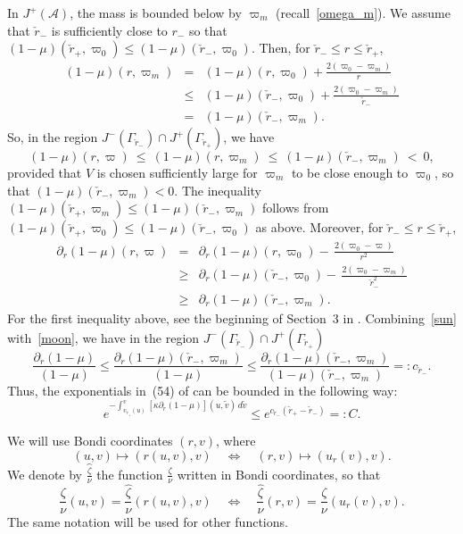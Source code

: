 \documentclass[a4paper,11pt,oneside,reqno]{amsart}
\newcommand{\cal}{\mathcal}
\newcommand{\ckrm}{\check r_-}
\newcommand{\ckrp}{\check r_+}
\newcommand{\hatz}{\widehat{\frac{\zeta}{\nu}}}
\newcommand{\vgrp}{v_{\ckrp}}
\newcommand{\ug}{u_r}
\begin{document}
In $J^+({\cal A})$, the mass is bounded below by $\varpi_m$ (recall~\eqref{omega_m}). We assume that
$\ckrm$ is sufficiently close to $r_-$ so that
$(1-\mu)(\ckrp,\varpi_0)\leq(1-\mu)(\ckrm,\varpi_0)$. Then,
for $\ckrm\leq r\leq\ckrp$,
\begin{eqnarray*}
(1-\mu)(r,\varpi_m)&=&(1-\mu)(r,\varpi_0)+\frac{2(\varpi_0-\varpi_m)}{r}\\
&\leq&(1-\mu)(\ckrm,\varpi_0)+\frac{2(\varpi_0-\varpi_m)}{\ckrm}\\
&=&(1-\mu)(\ckrm,\varpi_m).
\end{eqnarray*}
So,
in the region $J^-(\Gamma_{\ckrm})\cap J^+(\Gamma_{\ckrp})$, we have
\begin{equation}
(1-\mu)(r,\varpi)\ \leq\ (1-\mu)(r,\varpi_m)\ \leq\  (1-\mu)(\ckrm,\varpi_m)\ <\ 0,\label{sun}
\end{equation}
provided that $V$ is chosen sufficiently large for $\varpi_m$ to be close enough to
$\varpi_0$, so that $(1-\mu)(\ckrm,\varpi_m)<0$. The inequality $(1-\mu)(\ckrp,\varpi_m)\leq(1-\mu)(\ckrm,\varpi_m)$ follows from $(1-\mu)(\ckrp,\varpi_0)\leq(1-\mu)(\ckrm,\varpi_0)$ as above.
Moreover, for $\ckrm\leq r\leq\ckrp$,
\begin{eqnarray}
\partial_r(1-\mu)(r,\varpi)&=&\partial_r(1-\mu)(r,\varpi_0)-\,\frac{2(\varpi_0-\varpi)}{r^2}\nonumber\\
&\geq&\partial_r(1-\mu)(\ckrm,\varpi_0)-\,\frac{2(\varpi_0-\varpi_m)}{\ckrm^2}\nonumber\\
&\geq&\partial_r(1-\mu)(\ckrm,\varpi_m).\label{moon}
\end{eqnarray}
For the first inequality above, see the beginning of Section~3 in \cite{relIst2}.
Combining~\eqref{sun} with~\eqref{moon}, we have
in the region $J^-(\Gamma_{\ckrm})\cap J^+(\Gamma_{\ckrp})$
$$
\frac{\partial_r(1-\mu)}{(1-\mu)}\leq
\frac{\partial_r(1-\mu)(\ckrm,\varpi_m)}{(1-\mu)}
\leq\frac{\partial_r(1-\mu)(\ckrm,\varpi_m)}{(1-\mu)(\ckrm,\varpi_m)}
=:c_{\ckrm}.
$$
Thus, the exponentials in~(54) of \cite{relIst2} can be bounded in the following way:
\begin{equation}\label{c}
e^{-\int_{\vgrp(u)}^v[\kappa\partial_r(1-\mu)](u,\tilde v)\,d\tilde v}\leq e^{c_{\ckrm}(\ckrp-\ckrm)}=
:C.
\end{equation}


We will use Bondi coordinates $(r,v)$, where
\begin{equation}
(u,v)\mapsto(r(u,v),v)\quad \Leftrightarrow\quad (r,v)\mapsto (\ug(v),v).
\label{coordinates}
\end{equation}
We denote by $\hatz$ the function $\frac\zeta\nu$ written in Bondi coordinates, so that
$$
\frac\zeta\nu(u,v)=\hatz(r(u,v),v)
\quad \Leftrightarrow\quad
\hatz(r,v)=\frac\zeta\nu(\ug(v),v).
$$
The same notation will be used for other functions.
\end{document}
